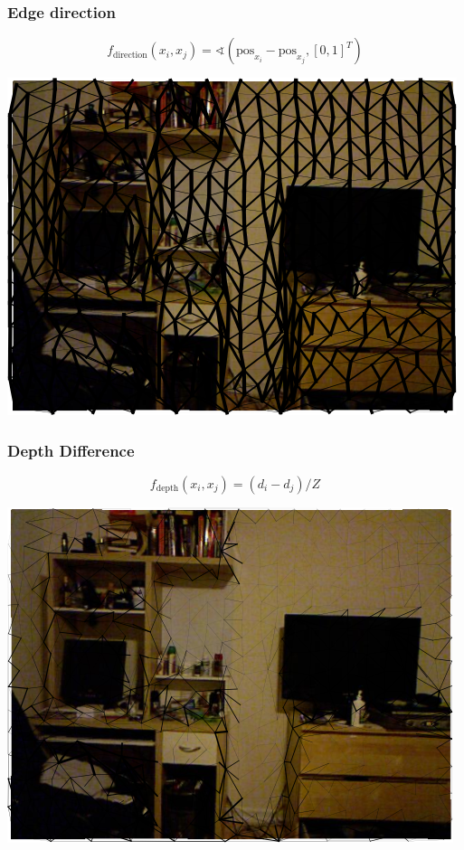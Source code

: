 \documentclass[final,ignorenonframetext,compress]{beamer}
\begin{document}
    \begin{frame}
        \frametitle{Edge direction}
        \[
            f_\text{direction}(x_i, x_j) = \sphericalangle(\text{pos}_{x_i} - \text{pos}_{x_j}, [0, 1]^T)
         \]
        \begin{center}
            \includegraphics[width=.6\linewidth]{images/00062_pipline_feature_pairwise_4}
        \end{center}
    \end{frame}

    \begin{frame}
        \frametitle{Depth Difference}
        \[
            f_\text{depth}(x_i, x_j) = (d_i - d_j) / Z
         \]
        \begin{center}
            \includegraphics[width=.6\linewidth]{images/00062_pipline_feature_pairwise_2}
        \end{center}
    \end{frame}
    
\end{document}
